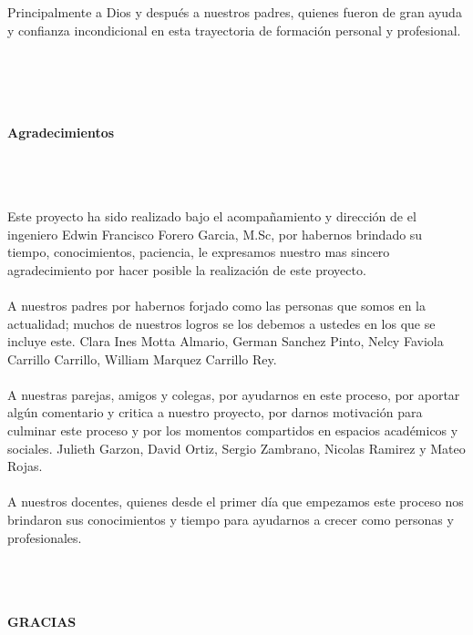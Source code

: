 \begin{flushright}
\begin{minipage}{8cm}
    \noindent
        \small
		Principalmente a Dios y después a nuestros padres, quienes fueron de gran ayuda y confianza incondicional en esta trayectoria de formación personal y profesional.  \\[4.0cm]\\
        
\end{minipage}
\end{flushright}


\newpage{\cleardoublepage}
\thispagestyle{empty} \textbf{}\normalsize
\\\\\\%
\textbf{\LARGE Agradecimientos}
\setcounter{page}{5}
\\\\\\
Este proyecto ha sido realizado bajo el acompañamiento y dirección de el ingeniero Edwin Francisco Forero Garcia, M.Sc, por habernos brindado su tiempo, conocimientos, paciencia, le expresamos nuestro mas sincero agradecimiento por hacer posible la realización de este proyecto.\\\\
A nuestros padres por habernos forjado como las personas que somos en la actualidad; muchos de nuestros logros se los debemos a ustedes en los que se incluye este. Clara Ines Motta Almario, German Sanchez Pinto, Nelcy Faviola Carrillo Carrillo, William Marquez Carrillo Rey.  \\\\
A nuestras parejas, amigos y colegas, por ayudarnos en este proceso, por aportar algún comentario y critica a nuestro proyecto, por darnos motivación para culminar este proceso y por los momentos compartidos en espacios académicos y sociales. Julieth Garzon, David Ortiz, Sergio Zambrano, Nicolas Ramirez y Mateo Rojas.  \\\\
A nuestros docentes, quienes desde el primer día que empezamos este proceso nos brindaron sus conocimientos y tiempo para ayudarnos a crecer como personas y profesionales.\\\\\\\\
\begin{flushright}
\textbf{\large{ GRACIAS}}
\end{flushright}



